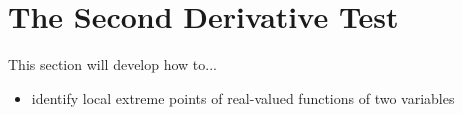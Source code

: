 

\section{The Second Derivative Test}
This section will develop how to...
\begin{itemize}
\item identify local extreme points of real-valued functions of two variables
\end{itemize}

